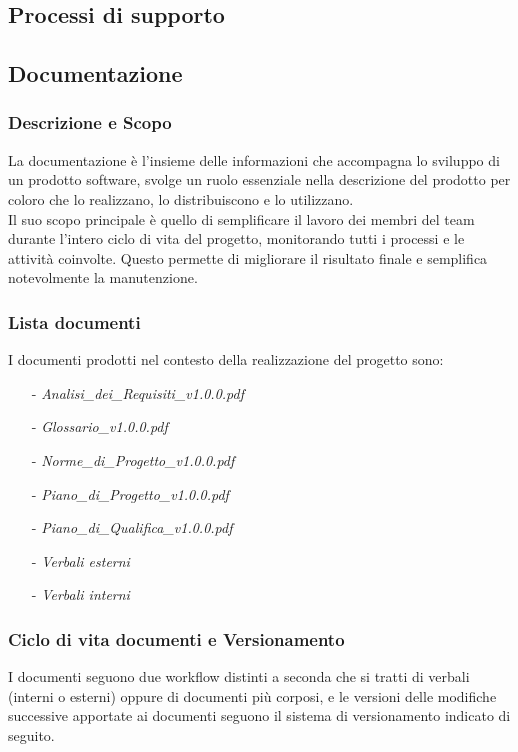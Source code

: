 \documentclass[10pt]{article}
\begin{document}
\begin{justify}
\newpage
\section{Processi di supporto}
    \subsection{Documentazione}

    \subsubsection{Descrizione e Scopo}
    La documentazione è l'insieme delle informazioni che accompagna lo sviluppo di un prodotto software, svolge un ruolo essenziale nella descrizione del prodotto per coloro che lo realizzano, lo distribuiscono e lo utilizzano.\\
    Il suo scopo principale è quello di semplificare il lavoro dei membri del team durante l'intero ciclo di vita del progetto, monitorando tutti i processi e le attività coinvolte. Questo permette di migliorare il risultato finale e semplifica notevolmente la manutenzione.

    \subsubsection{Lista documenti}
    I documenti prodotti nel contesto della realizzazione del progetto sono:
    \begin{itemize}
        \item [-] \textit{Analisi\_dei\_Requisiti\_v1.0.0.pdf}
        \item [-] \textit{Glossario\_v1.0.0.pdf}
        \item [-] \textit{Norme\_di\_Progetto\_v1.0.0.pdf}
        \item [-] \textit{Piano\_di\_Progetto\_v1.0.0.pdf}
        \item [-] \textit{Piano\_di\_Qualifica\_v1.0.0.pdf}
        \item [-] \textit{Verbali esterni}
        \item [-] \textit{Verbali interni}
    \end{itemize}

    \subsubsection{Ciclo di vita documenti e Versionamento}
    I documenti seguono due workflow distinti a seconda che si tratti di verbali (interni o esterni) oppure di documenti più corposi, e le versioni delle modifiche successive apportate ai documenti seguono il sistema di versionamento indicato di seguito.\\


\end{justify}
\end{document}
